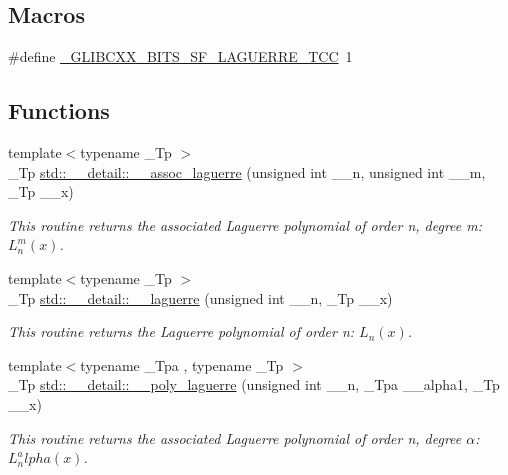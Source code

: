 \subsection*{Macros}
\begin{DoxyCompactItemize}
\item 
\#define \hyperlink{sf__laguerre_8tcc_a6d5a7e97abaa68b4a97764d871fb5314}{\+\_\+\+G\+L\+I\+B\+C\+X\+X\+\_\+\+B\+I\+T\+S\+\_\+\+S\+F\+\_\+\+L\+A\+G\+U\+E\+R\+R\+E\+\_\+\+T\+CC}~1
\end{DoxyCompactItemize}
\subsection*{Functions}
\begin{DoxyCompactItemize}
\item 
{\footnotesize template$<$typename \+\_\+\+Tp $>$ }\\\+\_\+\+Tp \hyperlink{namespacestd_1_1____detail_a7d47c4512f7c6914f5504fde6ffa31fb}{std\+::\+\_\+\+\_\+detail\+::\+\_\+\+\_\+assoc\+\_\+laguerre} (unsigned int \+\_\+\+\_\+n, unsigned int \+\_\+\+\_\+m, \+\_\+\+Tp \+\_\+\+\_\+x)
\begin{DoxyCompactList}\small\item\em This routine returns the associated Laguerre polynomial of order n, degree m\+: $ L_n^m(x) $. \end{DoxyCompactList}\item 
{\footnotesize template$<$typename \+\_\+\+Tp $>$ }\\\+\_\+\+Tp \hyperlink{namespacestd_1_1____detail_aa714c4983a3cb7d9d18e0c2c5a8f6826}{std\+::\+\_\+\+\_\+detail\+::\+\_\+\+\_\+laguerre} (unsigned int \+\_\+\+\_\+n, \+\_\+\+Tp \+\_\+\+\_\+x)
\begin{DoxyCompactList}\small\item\em This routine returns the Laguerre polynomial of order n\+: $ L_n(x) $. \end{DoxyCompactList}\item 
{\footnotesize template$<$typename \+\_\+\+Tpa , typename \+\_\+\+Tp $>$ }\\\+\_\+\+Tp \hyperlink{namespacestd_1_1____detail_a76704115fd45b240802f4ccc433bb033}{std\+::\+\_\+\+\_\+detail\+::\+\_\+\+\_\+poly\+\_\+laguerre} (unsigned int \+\_\+\+\_\+n, \+\_\+\+Tpa \+\_\+\+\_\+alpha1, \+\_\+\+Tp \+\_\+\+\_\+x)
\begin{DoxyCompactList}\small\item\em This routine returns the associated Laguerre polynomial of order n, degree $ \alpha $\+: $ L_n^alpha(x) $. \end{DoxyCompactList}\item 

\end{DoxyCompactItemize}
